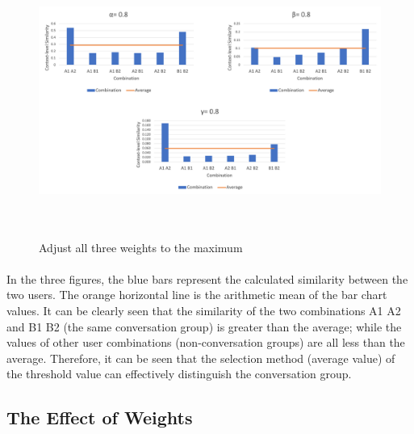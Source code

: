 \documentclass[a4paper,12pt]{report}
\begin{document}
\begin{figure}[btph]
\begin{center}
\includegraphics[width=6.41in,height=3.5in]{images and data/Result_Threshold.png}
\caption{Adjust all three weights to the maximum}
\label{f:Result_Threshold}
\end{center}
\end{figure}

\paragraph{}
In the three figures, the blue bars represent the calculated similarity between the two users. The orange horizontal line is the arithmetic mean of the bar chart values. It can be clearly seen that the similarity of the two combinations A1 A2 and B1 B2 (the same conversation group) is greater than the average; while the values of other user combinations (non-conversation groups) are all less than the average. Therefore, it can be seen that the selection method (average value) of the threshold value can effectively distinguish the conversation group.
\clearpage
\subsection{The Effect of Weights}
\end{document}
